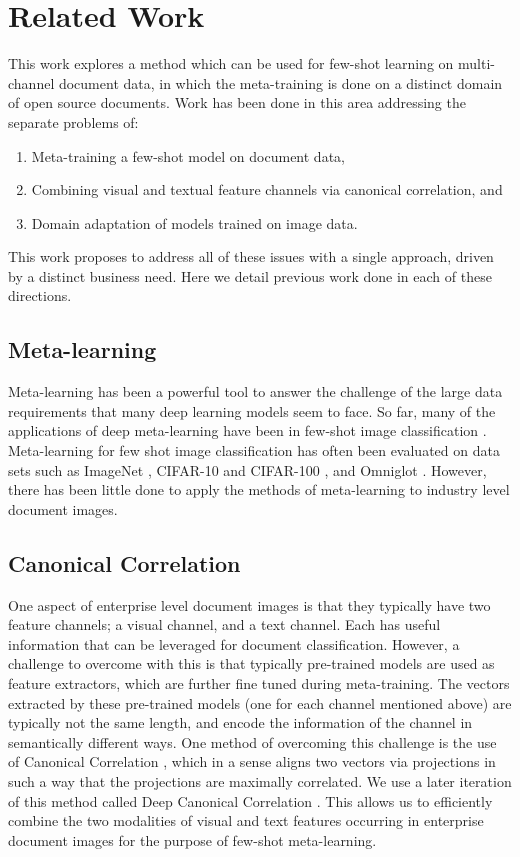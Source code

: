 \section{Related Work}
This work explores a method which can be used for few-shot learning on multi-channel document data, in which the meta-training is done on a distinct domain of open source documents. Work has been done in this area addressing the separate problems of: 
    \begin{enumerate}
        \item Meta-training a few-shot model on document data,
        \item Combining visual and textual feature channels via canonical correlation, and
        \item Domain adaptation of models trained on image data.
    \end{enumerate}
This work proposes to address all of these issues with a single approach, driven by a distinct business need. Here we detail previous work done in each of these directions.

\subsection{Meta-learning} Meta-learning has been a powerful tool to answer the challenge of the large data requirements that many deep learning models seem to face. So far, many of the applications of deep meta-learning have been in few-shot image classification \cite{finn2019online,snell2017prototypical,ravi2016optimization}. Meta-learning for few shot image classification has often been evaluated on data sets such as ImageNet \cite{russakovsky2015imagenet}, CIFAR-10 and CIFAR-100 \cite{Krizhevsky2009LearningML}, and Omniglot \cite{Lake2011OneSL}. However, there has been little done to apply the methods of meta-learning to industry level document images. 

\subsection{Canonical Correlation} One aspect of enterprise level document images is that they typically have two feature channels; a visual channel, and a text channel. Each has useful information that can be leveraged for document classification. However, a challenge to overcome with this is that typically pre-trained models are used as feature extractors, which are further fine tuned during meta-training. The vectors extracted by these pre-trained models (one for each channel mentioned above) are typically not the same length, and encode the information of the channel in semantically different ways. One method of overcoming this challenge is the use of Canonical Correlation \cite{hotelling1992relations,akaho2006kernel, melzer2001nonlinear,bach2002kernel,andrew2013deep}, which in a sense aligns two vectors via projections in such a way that the projections are maximally correlated. We use a later iteration of this method called Deep Canonical Correlation \cite{andrew2013deep}. This allows us to efficiently combine the two modalities of visual and text features occurring in enterprise document images for the purpose of few-shot meta-learning. 
